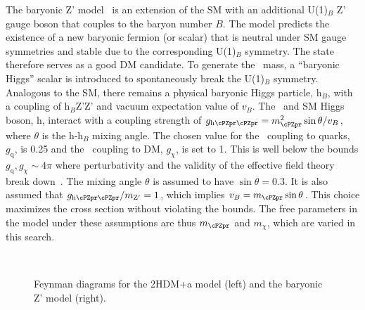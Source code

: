 The baryonic Z' model~\cite{PhysRevD.89.075017} is an extension of the SM with an additional U(1)$_{B}$ Z' gauge 
boson that couples to the baryon number $B$. The model predicts the existence of a new baryonic fermion (or scalar) that is neutral under SM gauge symmetries and stable due to the corresponding U(1)$_{B}$ symmetry. The state therefore serves as a good DM candidate.
To generate the  \cPZpr\ mass, a ``baryonic Higgs'' scalar is introduced to 
spontaneously break the U(1)$_B$ symmetry. Analogous to the SM, there remains 
a physical baryonic Higgs particle, h$_{B}$, with a coupling of h$_{B}$Z'Z' 
and vacuum expectation value of $v_{B}$. 
The \cPZpr\ and SM Higgs boson, h, interact with a coupling strength of 
$g_{\text{h}\cPZpr\cPZpr} = m_{\cPZpr}^{2} \sin \theta/v_{B}$, where $\theta$ is the h-h$_{B}$ 
mixing angle. The chosen value for the \cPZpr\ coupling to quarks,
$g_\text{q}$, is 0.25 and the \cPZpr\ coupling to DM, $g_\chi$, is set to 1. This is well below the bounds $g_\text{q},g_\chi\sim4\pi$ where perturbativity and the validity of the effective field theory break down~\cite{PhysRevD.89.075017}. The mixing angle $\theta$ is assumed to have $\sin\theta= 0.3$. It is also assumed that $g_{\text{h}\cPZpr\cPZpr}/m_{\mathrm{Z}'}=1$, which implies $v_B=m_{\cPZpr}\sin\theta$. This choice maximizes the cross section without violating the bounds. The free parameters in the model under these assumptions are thus $m_{\cPZpr}$ and $m_\chi$, which are varied in this search.

\begin{figure}
\centering
 \hspace{1cm}
  \\
\caption{Feynman diagrams for the 2HDM+a model (left) and the baryonic Z' model (right).}
\label{feyns}
\end{figure}


